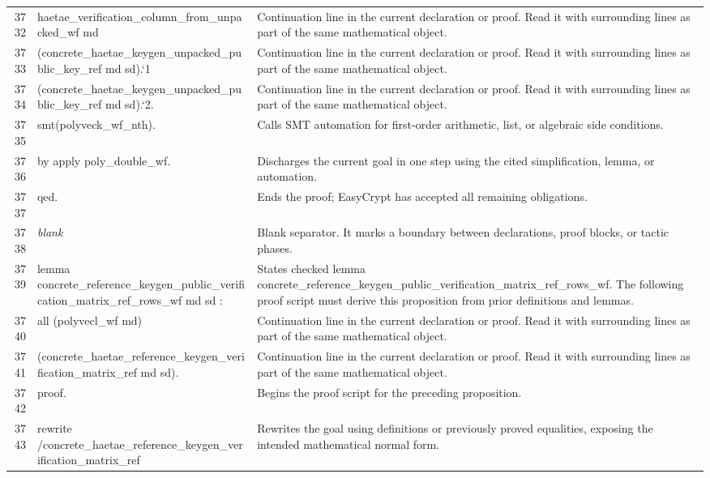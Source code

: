 \documentclass[10pt]{article}
\begin{document}
\begin{longtable}{r L{0.53\textwidth} L{0.37\textwidth}}
3732 & {\ttfamily\scriptsize     haetae\_verification\_column\_from\_unpacked\_wf md} & Continuation line in the current declaration or proof.  Read it with surrounding lines as part of the same mathematical object. \\
3733 & {\ttfamily\scriptsize       (concrete\_haetae\_keygen\_unpacked\_public\_key\_ref md sd).`1} & Continuation line in the current declaration or proof.  Read it with surrounding lines as part of the same mathematical object. \\
3734 & {\ttfamily\scriptsize       (concrete\_haetae\_keygen\_unpacked\_public\_key\_ref md sd).`2.} & Continuation line in the current declaration or proof.  Read it with surrounding lines as part of the same mathematical object. \\
3735 & {\ttfamily\scriptsize   smt(polyveck\_wf\_nth).} & Calls SMT automation for first-order arithmetic, list, or algebraic side conditions. \\
3736 & {\ttfamily\scriptsize by apply poly\_double\_wf.} & Discharges the current goal in one step using the cited simplification, lemma, or automation. \\
3737 & {\ttfamily\scriptsize qed.} & Ends the proof; EasyCrypt has accepted all remaining obligations. \\
3738 & {\ttfamily\scriptsize \emph{blank}} & Blank separator.  It marks a boundary between declarations, proof blocks, or tactic phases. \\
3739 & {\ttfamily\scriptsize lemma concrete\_reference\_keygen\_public\_verification\_matrix\_ref\_rows\_wf md sd :} & States checked lemma concrete\_reference\_keygen\_public\_verification\_matrix\_ref\_rows\_wf.  The following proof script must derive this proposition from prior definitions and lemmas. \\
3740 & {\ttfamily\scriptsize   all (polyvecl\_wf md)} & Continuation line in the current declaration or proof.  Read it with surrounding lines as part of the same mathematical object. \\
3741 & {\ttfamily\scriptsize     (concrete\_haetae\_reference\_keygen\_verification\_matrix\_ref md sd).} & Continuation line in the current declaration or proof.  Read it with surrounding lines as part of the same mathematical object. \\
3742 & {\ttfamily\scriptsize proof.} & Begins the proof script for the preceding proposition. \\
3743 & {\ttfamily\scriptsize rewrite /concrete\_haetae\_reference\_keygen\_verification\_matrix\_ref} & Rewrites the goal using definitions or previously proved equalities, exposing the intended mathematical normal form. \\

\end{longtable}
\end{document}
